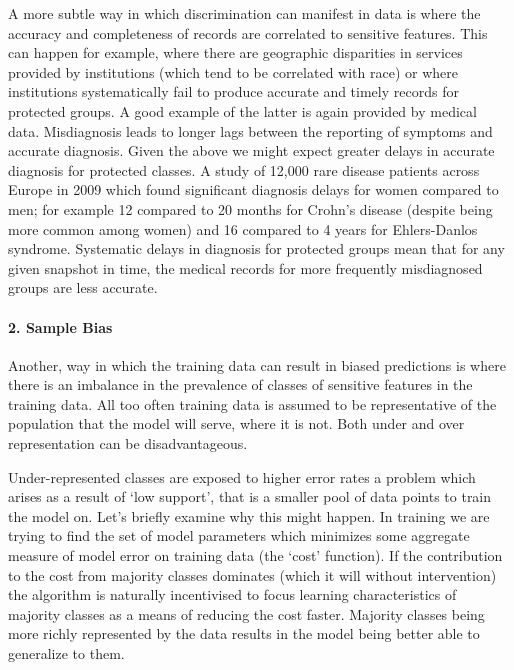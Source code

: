 A more subtle way in which discrimination can manifest in data is where the accuracy and completeness of records are correlated to sensitive features. This can happen for example, where there are geographic disparities in services provided by institutions (which tend to be correlated with race) or where institutions systematically fail to produce accurate and timely records for protected groups. A good example of the latter is again provided by medical data. Misdiagnosis leads to longer lags between the reporting of symptoms and accurate diagnosis. Given the above we might expect greater delays in accurate diagnosis for protected classes. A study of 12,000 rare disease patients across Europe in 2009 which found significant diagnosis delays for women compared to men\cite{EU12K}; for example 12 compared to 20 months for Crohn's disease (despite being more common among women) and 16 compared to 4 years for Ehlers-Danlos syndrome. Systematic delays in diagnosis for protected groups mean that for any given snapshot in time, the medical records for more frequently misdiagnosed groups are less accurate.

\paragraph*{2. Sample Bias}

Another, way in which the training data can result in biased predictions is where there is an imbalance in the prevalence of classes of sensitive features in the training data. All too often training data is assumed to be representative of the population that the model will serve, where it is not. Both under and over representation can be disadvantageous.

Under-represented classes are exposed to higher error rates a problem which arises as a result of `low support', that is a smaller pool of data points to train the model on. Let's briefly examine why this might happen. In training we are trying to find the set of model parameters which minimizes some aggregate measure of model error on training data (the `cost' function). If the contribution to the cost from majority classes dominates (which it will without intervention) the algorithm is naturally incentivised to focus learning characteristics of majority classes as a means of reducing the cost faster. Majority classes being more richly represented by the data results in the model being better able to generalize to them.

